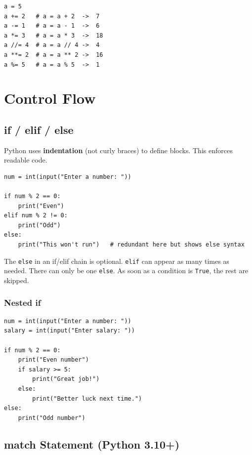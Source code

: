\documentclass[12pt,a4paper]{article}
\newcommand{\code}[1]{\texttt{\small\color{pyblue}#1}}
\begin{document}
\begin{lstlisting}
a = 5
a += 2   # a = a + 2  ->  7
a -= 1   # a = a - 1  ->  6
a *= 3   # a = a * 3  ->  18
a //= 4  # a = a // 4 ->  4
a **= 2  # a = a ** 2 ->  16
a %= 5   # a = a % 5  ->  1
\end{lstlisting}

\section{Control Flow}

\subsection{if / elif / else}

Python uses \textbf{indentation} (not curly braces) to define blocks. This enforces readable code.

\begin{lstlisting}
num = int(input("Enter a number: "))

if num % 2 == 0:
    print("Even")
elif num % 2 != 0:
    print("Odd")
else:
    print("This won't run")   # redundant here but shows else syntax
\end{lstlisting}

\begin{tipbox}
The \code{else} in an if/elif chain is optional. \code{elif} can appear as many times as needed. There can only be one \code{else}. As soon as a condition is \code{True}, the rest are skipped.
\end{tipbox}

\subsubsection{Nested if}

\begin{lstlisting}
num = int(input("Enter a number: "))
salary = int(input("Enter salary: "))

if num % 2 == 0:
    print("Even number")
    if salary >= 5:
        print("Great job!")
    else:
        print("Better luck next time.")
else:
    print("Odd number")
\end{lstlisting}

\subsection{match Statement (Python 3.10+)}
\end{document}
